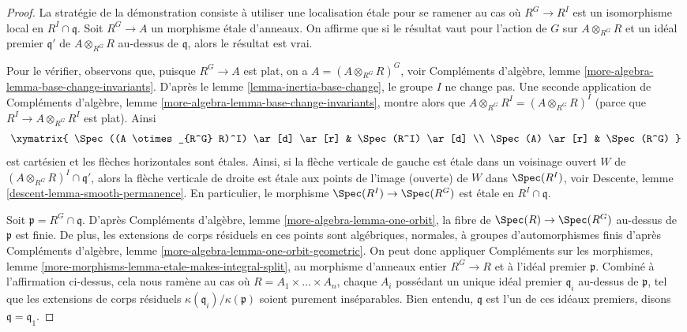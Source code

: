 \begin{proof}
La stratégie de la démonstration consiste à utiliser une localisation étale pour
se ramener au cas où $R^G \to R^I$ est un isomorphisme local en
$R^I \cap \mathfrak q$.
Soit $R^G \to A$ un morphisme étale d'anneaux. On affirme que si le résultat
vaut pour l'action de $G$ sur $A \otimes_{R^G} R$ et un idéal premier
$\mathfrak q'$ de $A \otimes_{R^G} R$ au-dessus de $\mathfrak q$, alors
le résultat est vrai.

\medskip\noindent
Pour le vérifier, observons que, puisque $R^G \to A$ est plat, on a
$A = (A \otimes_{R^G} R)^G$, voir Compléments d'algèbre,
lemme \ref{more-algebra-lemma-base-change-invariants}.
D'après le lemme \ref{lemma-inertia-base-change}, le groupe $I$ ne change pas.
Une seconde application de Compléments d'algèbre,
lemme \ref{more-algebra-lemma-base-change-invariants},
montre alors que $A \otimes_{R^G} R^I = (A \otimes_{R^G} R)^I$
(parce que $R^I \to A \otimes_{R^G} R^I$ est plat).
Ainsi
$$
\xymatrix{
\Spec((A \otimes_{R^G} R)^I) \ar[d] \ar[r] & \Spec(R^I) \ar[d] \\
\Spec(A) \ar[r] & \Spec(R^G)
}
$$
est cartésien et les flèches horizontales sont étales. Ainsi, si la
flèche verticale de gauche est étale dans un voisinage ouvert $W$ de
$(A \otimes_{R^G} R)^I \cap \mathfrak q'$, alors la flèche verticale de droite
est étale aux points de l'image (ouverte) de $W$ dans
$\Spec(R^I)$, voir
Descente, lemme \ref{descent-lemma-smooth-permanence}. En particulier,
le morphisme $\Spec(R^I) \to \Spec(R^G)$ est étale en $R^I \cap \mathfrak q$.

\medskip\noindent
Soit $\mathfrak p = R^G \cap \mathfrak q$.
D'après Compléments d'algèbre, lemme \ref{more-algebra-lemma-one-orbit},
la fibre de $\Spec(R) \to \Spec(R^G)$ au-dessus de $\mathfrak p$ est
finie. De plus, les extensions de corps résiduels en ces points
sont algébriques, normales, à groupes d'automorphismes finis d'après
Compléments d'algèbre, lemme \ref{more-algebra-lemma-one-orbit-geometric}.
On peut donc appliquer
Compléments sur les morphismes,
lemme \ref{more-morphisms-lemma-etale-makes-integral-split},
au morphisme d'anneaux entier $R^G \to R$ et à l'idéal premier $\mathfrak p$.
Combiné à l'affirmation ci-dessus, cela nous ramène au cas où
$R = A_1 \times \ldots \times A_n$, chaque $A_i$ possédant un unique
idéal premier $\mathfrak q_i$ au-dessus de $\mathfrak p$, tel que les
extensions de corps résiduels $\kappa(\mathfrak q_i)/\kappa(\mathfrak p)$
soient purement inséparables. Bien entendu, $\mathfrak q$ est l'un de
ces idéaux premiers, disons $\mathfrak q = \mathfrak q_1$.


\end{proof}
